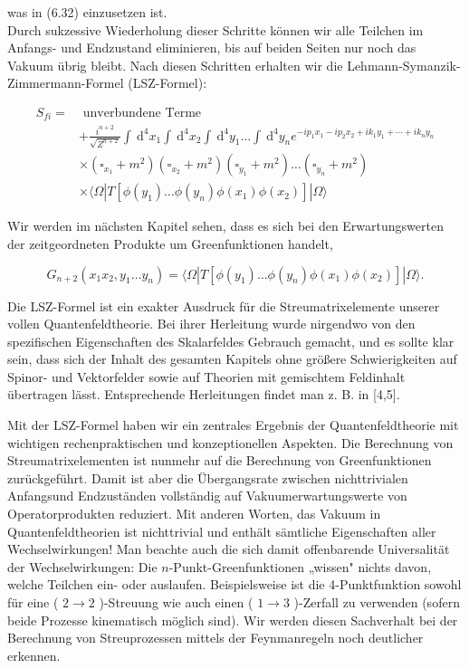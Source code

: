 \documentclass[10pt, letterpaper]{article}
\begin{document}
was in (6.32) einzusetzen ist.\\
Durch sukzessive Wiederholung dieser Schritte können wir alle Teilchen im Anfangs- und Endzustand eliminieren, bis auf beiden Seiten nur noch das Vakuum übrig bleibt. Nach diesen Schritten erhalten wir die Lehmann-Symanzik-Zimmermann-Formel (LSZ-Formel):

$$
\begin{aligned}
S_{f i}= & \text { unverbundene Terme } \\
& +\frac{i^{n+2}}{\sqrt{Z^{n+2}}} \int \mathrm{~d}^{4} x_{1} \int \mathrm{~d}^{4} x_{2} \int \mathrm{~d}^{4} y_{1} \ldots \int \mathrm{~d}^{4} y_{n} e^{-i p_{1} x_{1}-i p_{2} x_{2}+i k_{1} y_{1}+\cdots+i k_{n} y_{n}} \\
& \times\left(\square_{x_{1}}+m^{2}\right)\left(\square_{x_{2}}+m^{2}\right)\left(\square_{y_{1}}+m^{2}\right) \ldots\left(\square_{y_{n}}+m^{2}\right) \\
& \times\langle\Omega| T\left[\phi\left(y_{1}\right) \ldots \phi\left(y_{n}\right) \phi\left(x_{1}\right) \phi\left(x_{2}\right)\right]|\Omega\rangle
\end{aligned}
$$

Wir werden im nächsten Kapitel sehen, dass es sich bei den Erwartungswerten der zeitgeordneten Produkte um Greenfunktionen handelt,

$$
G_{n+2}\left(x_{1} x_{2}, y_{1} \ldots y_{n}\right)=\langle\Omega| T\left[\phi\left(y_{1}\right) \ldots \phi\left(y_{n}\right) \phi\left(x_{1}\right) \phi\left(x_{2}\right)\right]|\Omega\rangle .
$$

Die LSZ-Formel ist ein exakter Ausdruck für die Streumatrixelemente unserer vollen Quantenfeldtheorie. Bei ihrer Herleitung wurde nirgendwo von den spezifischen Eigenschaften des Skalarfeldes Gebrauch gemacht, und es sollte klar sein, dass sich der Inhalt des gesamten Kapitels ohne größere Schwierigkeiten auf Spinor- und Vektorfelder sowie auf Theorien mit gemischtem Feldinhalt übertragen lässt. Entsprechende Herleitungen findet man z. B. in [4,5].

Mit der LSZ-Formel haben wir ein zentrales Ergebnis der Quantenfeldtheorie mit wichtigen rechenpraktischen und konzeptionellen Aspekten. Die Berechnung von Streumatrixelementen ist nunmehr auf die Berechnung von Greenfunktionen zurückgeführt. Damit ist aber die Übergangsrate zwischen nichttrivialen Anfangsund Endzuständen vollständig auf Vakuumerwartungswerte von Operatorprodukten reduziert. Mit anderen Worten, das Vakuum in Quantenfeldtheorien ist nichttrivial und enthält sämtliche Eigenschaften aller Wechselwirkungen! Man beachte auch die sich damit offenbarende Universalität der Wechselwirkungen: Die $n$-Punkt-Greenfunktionen „wissen" nichts davon, welche Teilchen ein- oder auslaufen. Beispielsweise ist die 4-Punktfunktion sowohl für eine ( $2 \longrightarrow 2$ )-Streuung wie auch einen ( $1 \longrightarrow 3$ )-Zerfall zu verwenden (sofern beide Prozesse kinematisch möglich sind). Wir werden diesen Sachverhalt bei der Berechnung von Streuprozessen mittels der Feynmanregeln noch deutlicher erkennen.
\end{document}
